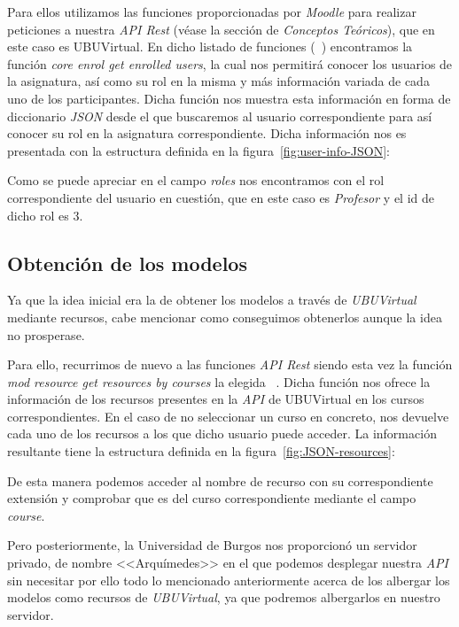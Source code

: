 Para ellos utilizamos las funciones proporcionadas por \textit{Moodle} para realizar peticiones a nuestra \textit{API Rest} (véase la sección de \textit{Conceptos Teóricos}), que en este caso es UBUVirtual. En dicho listado de funciones (~\cite{moodle:web-service-api-functions}) encontramos la función \textit{core enrol get enrolled users}, la cual nos permitirá conocer los usuarios de la asignatura, así como su rol en la misma y más información variada de cada uno de los participantes. Dicha función nos muestra esta información en forma de diccionario \textit{JSON} desde el que buscaremos al usuario correspondiente para así conocer su rol en la asignatura correspondiente. Dicha información nos es presentada con la estructura definida en la figura~\ref{fig:user-info-JSON}:

Como se puede apreciar en el campo \textit{roles} nos encontramos con el rol correspondiente del usuario en cuestión, que en este caso es \textit{Profesor} y el id de dicho rol es $3$.

\subsection{Obtención de los modelos}
Ya que la idea inicial era la de obtener los modelos a través de \textit{UBUVirtual} mediante recursos, cabe mencionar como conseguimos obtenerlos aunque la idea no prosperase.

Para ello, recurrimos de nuevo a las funciones \textit{API Rest} siendo esta vez la función \textit{mod resource get resources by courses} la elegida ~\cite{moodle:web-service-api-functions}. Dicha función nos ofrece la información de los recursos presentes en la \textit{API} de UBUVirtual en los cursos correspondientes. En el caso de no seleccionar un curso en concreto, nos devuelve cada uno de los recursos a los que dicho usuario puede acceder. La información resultante tiene la estructura definida en la figura~\ref{fig:JSON-resources}:

De esta manera podemos acceder al nombre de recurso con su correspondiente extensión y comprobar que es del curso correspondiente mediante el campo \textit{course}.

Pero posteriormente, la Universidad de Burgos nos proporcionó un servidor privado, de nombre <<Arquímedes>> en el que podemos desplegar nuestra \textit{API} sin necesitar por ello todo lo mencionado anteriormente acerca de los albergar los modelos como recursos de \textit{UBUVirtual}, ya que podremos albergarlos en nuestro servidor.

